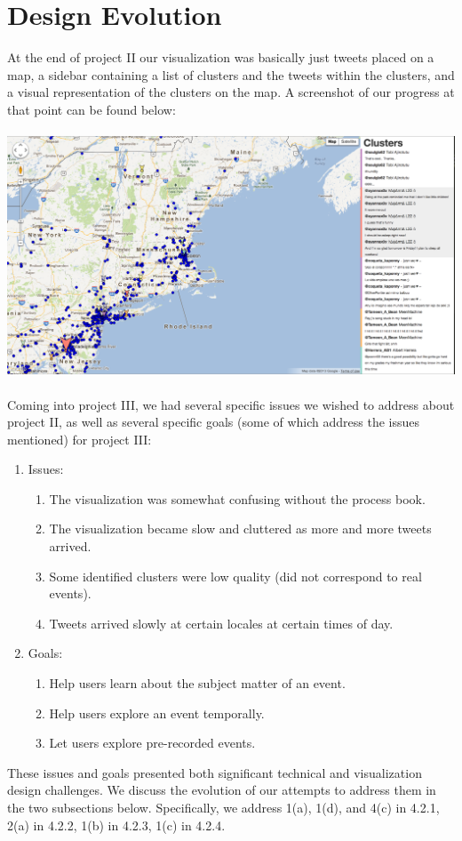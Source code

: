 \documentclass[pdftex,12pt,a4paper]{article}
\begin{document}
\section{Design Evolution}
At the end of project II our visualization was basically just tweets placed on a map, a sidebar containing a list of clusters and the tweets within the clusters, and a visual representation of the clusters on the map. A screenshot of our progress at that point can be found below: \\ \\
\includegraphics[width=5.5in]{project2.png} \\ \\
Coming into project III, we had several specific issues we wished to address about project II, as well as several specific goals (some of which address the issues mentioned) for project III:
\begin{enumerate}
\item Issues:
\begin{enumerate}
\item The visualization was somewhat confusing without the process book.
\item The visualization became slow and cluttered as more and more tweets arrived.
\item Some identified clusters were low quality (did not correspond to real events).
\item Tweets arrived slowly at certain locales at certain times of day.
\end{enumerate}
\item Goals:
\begin{enumerate}
\item Help users learn about the subject matter of an event.
\item Help users explore an event temporally.
\item Let users explore pre-recorded events. 
\end{enumerate}
\end{enumerate}
These issues and goals presented both significant technical and visualization design challenges. We discuss the evolution of our attempts to address them in the two subsections below. Specifically, we  address 1(a), 1(d), and 4(c) in 4.2.1, 2(a) in 4.2.2, 1(b) in 4.2.3, 1(c) in 4.2.4.
\end{document}
